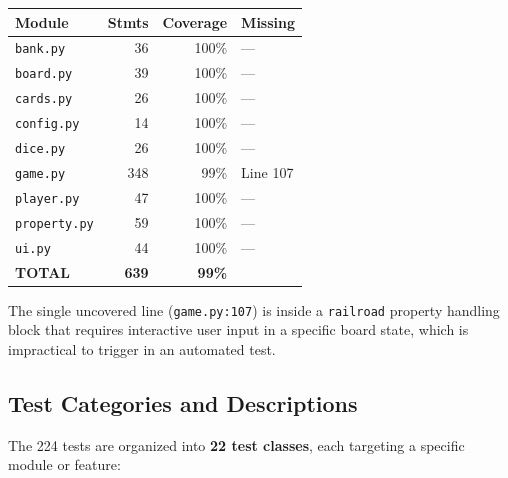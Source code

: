 \documentclass[12pt,a4paper]{article}
\begin{document}
\begin{center}
\begin{tabular}{lrrp{3cm}}
\toprule
\textbf{Module} & \textbf{Stmts} & \textbf{Coverage} & \textbf{Missing} \\
\midrule
\texttt{bank.py} & 36 & 100\% & --- \\
\texttt{board.py} & 39 & 100\% & --- \\
\texttt{cards.py} & 26 & 100\% & --- \\
\texttt{config.py} & 14 & 100\% & --- \\
\texttt{dice.py} & 26 & 100\% & --- \\
\texttt{game.py} & 348 & 99\% & Line 107 \\
\texttt{player.py} & 47 & 100\% & --- \\
\texttt{property.py} & 59 & 100\% & --- \\
\texttt{ui.py} & 44 & 100\% & --- \\
\midrule
\textbf{TOTAL} & \textbf{639} & \textbf{99\%} & \\
\bottomrule
\end{tabular}
\end{center}

The single uncovered line (\texttt{game.py:107}) is inside a \texttt{railroad} property handling block that requires interactive user input in a specific board state, which is impractical to trigger in an automated test.

\subsection{Test Categories and Descriptions}

The 224 tests are organized into \textbf{22 test classes}, each targeting a specific module or feature:
\end{document}
